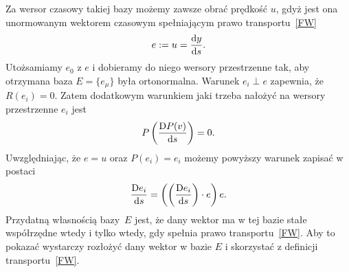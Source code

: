 Za wersor czasowy takiej bazy możemy zawsze obrać prędkość $u$, gdyż 
jest ona unormowanym wektorem czasowym spełniającym 
prawo transportu~\eqref{FW}
\begin{align*}
e := u = \frac{\text{d} y}{\text{d} s}.
\end{align*}
Utożsamiamy $e_0$ z $e$ i dobieramy do niego wersory 
przestrzenne tak, aby otrzymana baza $E=\{ e_\mu \}$ była
 ortonormalna.  Warunek $e_i \perp e$ zapewnia, że $R(e_i)=0$. 
Zatem dodatkowym warunkiem jaki trzeba nałożyć na wersory
przestrzenne $e_i$ jest 
\begin{align*}
P \left(\frac{\text{D} P(v)}{\text{d} s} \right)  = 0.
\end{align*} 
Uwzględniając, że $e=u$ oraz $P(e_i)=e_i$ możemy powyższy warunek
zapisać w postaci
\begin{align}\label{FWwkw}
\frac{\text{D} e_i }{\text{d} s} = 
\left( \left(\frac{\text{D} e_i }{\text{d} s}\right) \cdot e\right) e .
\end{align}
Przydatną własnością bazy~$E$ jest, że dany wektor 
ma w tej bazie stałe współrzędne wtedy i tylko wtedy, gdy
spełnia prawo transportu~\eqref{FW}.
Aby to pokazać wystarczy rozłożyć dany wektor w bazie 
$E$ i skorzystać z definicji transportu~\eqref{FW}.

